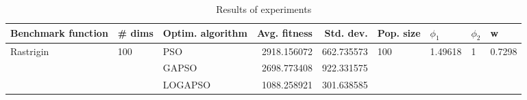 \begin{table}
\centering
\caption{Results of experiments}
\begin{tabular}{lllrrllll}
\toprule
        Benchmark function &              \# dims & Optim. algorithm &  Avg. fitness &  Std. dev. &            Pop. size &               $\phi_{1}$ &         $\phi_{2}$ &                       w \\
\midrule
\multirow{3}{*}{Rastrigin} & \multirow{3}{*}{100} &              PSO &   2918.156072 & 662.735573 & \multirow{3}{*}{100} & \multirow{3}{*}{1.49618} & \multirow{3}{*}{1} & \multirow{3}{*}{0.7298} \\
                           &                      &            GAPSO &   2698.773408 & 922.331575 &                      &                          &                    &                         \\
                           &                      &          LOGAPSO &   1088.258921 & 301.638585 &                      &                          &                    &                         \\
\bottomrule
\end{tabular}
\end{table}
